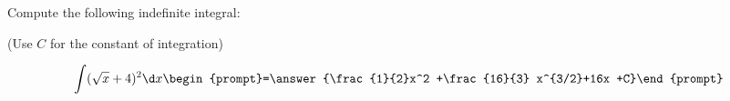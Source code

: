\documentclass{ximera}
\author{Jim Talamo}
\begin{document}
\begin{exercise}
Compute the following indefinite integral:

\begin{prompt} (Use $C$ for the constant of integration) \end{prompt}

\[
\int (\sqrt{x}+4)^2  \d x 
\begin{prompt}=\answer{\frac{1}{2}x^2 +\frac{16}{3} x^{3/2}+16x +C}\end{prompt}
\]
\end{exercise}
\end{document}
